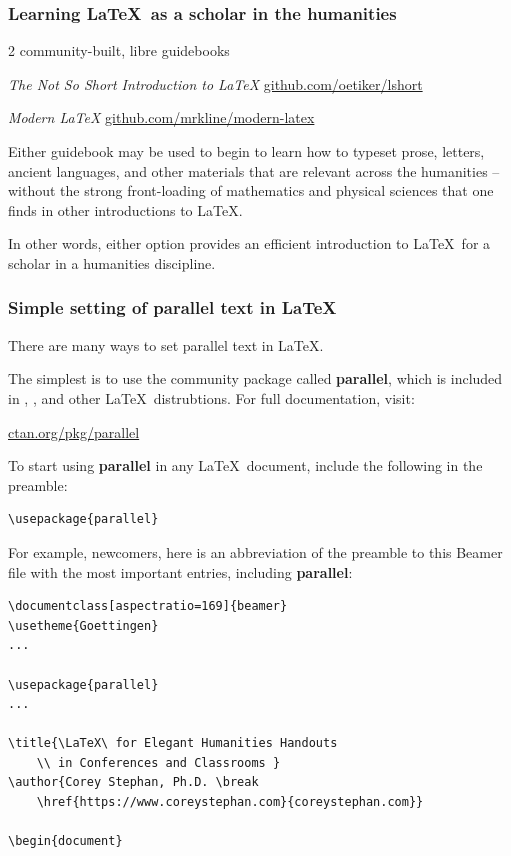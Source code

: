 \documentclass[aspectratio=169]{beamer}
\begin{document}
\begin{frame}
	\frametitle[Starting \LaTeX]{Learning \LaTeX\ as a scholar in the humanities}

2 community-built, libre guidebooks \break

\textit{The Not So Short Introduction to \LaTeX} \hfill
\href{https://github.com/oetiker/lshort}{github.com/oetiker/lshort} \break

\break \textit{Modern \LaTeX} \hfill
\href{https://github.com/mrkline/modern-latex}{github.com/mrkline/modern-latex} \break

Either guidebook may be used to begin to learn how to typeset prose, letters, ancient languages, and other materials that are relevant across the humanities -- without the strong front-loading of mathematics and physical sciences that one finds in other introductions to \LaTeX. \break

In other words, either option provides an efficient introduction to \LaTeX\ for a scholar in a humanities discipline.

\end{frame}


\begin{frame}[fragile]
	\frametitle[Simple Parallel Text]{Simple setting of parallel text in \LaTeX}
There are many ways to set parallel text in \LaTeX.\break

The simplest is to use the community package called \textbf{parallel}, which is included in , , and other \LaTeX\ distrubtions. For full documentation, visit: \break 

\href{https://ctan.org/pkg/parallel}{ctan.org/pkg/parallel} \break

To start using \textbf{parallel} in any \LaTeX\ document, include the following in the preamble: \break

\begin{lstlisting}
\usepackage{parallel}
\end{lstlisting}
\end{frame}

\begin{frame}[fragile]
For example, newcomers, here is an abbreviation of the preamble to this Beamer file with the most important entries, including \textbf{parallel}: \break

{\footnotesize \begin{lstlisting}
\documentclass[aspectratio=169]{beamer}
\usetheme{Goettingen}
...

\usepackage{parallel}
...

\title{\LaTeX\ for Elegant Humanities Handouts 
	\\ in Conferences and Classrooms }
\author{Corey Stephan, Ph.D. \break 
	\href{https://www.coreystephan.com}{coreystephan.com}}

\begin{document}
\end{lstlisting}}
\end{frame}
\end{document}

